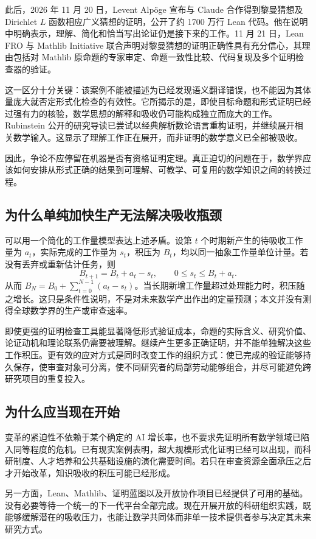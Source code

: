 \documentclass[UTF8,11pt,a4paper,fontset=fandol]{ctexart}
\theoremstyle{definition}\newtheorem{definition}{定义}
\begin{document}
此后，2026 年 11 月 20 日，Levent Alpöge 宣布与 Claude 合作得到黎曼猜想及 Dirichlet $L$ 函数相应广义猜想的证明，公开了约 1700 万行 Lean 代码。他在说明中明确表示，理解、简化和恰当写出论证仍是接下来的工作\cite{alpoge}。11 月 21 日，Lean FRO 与 Mathlib Initiative 联合声明对黎曼猜想的证明正确性具有充分信心，其理由包括对 Mathlib 原命题的专家审定、命题一致性比较、代码复现及多个证明检查器的验证\cite{rh}。

这一区分十分关键：该案例不能被描述为已经发现语义翻译错误，也不能因为其体量庞大就否定形式化检查的有效性。它所揭示的是，即使目标命题和形式证明已经过强有力的核验，数学思想的解释和吸收仍可能构成独立而庞大的工作。Rubinstein 公开的研究导读已尝试以经典解析数论语言重构证明，并继续展开相关数学输入\cite{rubinstein}。这显示了理解工作正在展开，而非证明的数学意义已全部被吸收。

因此，争论不应停留在机器是否有资格证明定理。真正迫切的问题在于，数学界应该如何安排从形式正确的结果到可理解、可教学、可复用的数学知识之间的转换过程。

\subsection{为什么单纯加快生产无法解决吸收瓶颈}
可以用一个简化的工作量模型表达上述矛盾。设第 $t$ 个时期新产生的待吸收工作量为 $a_t$，实际完成的工作量为 $s_t$，积压为 $B_t$，均以同一抽象工作量单位计量。若没有丢弃或重新估计任务，则
\[
 B_{t+1}=B_t+a_t-s_t,\qquad 0\le s_t\le B_t+a_t.
\]
从而 $B_N=B_0+\sum_{t=0}^{N-1}(a_t-s_t)$。当长期新增工作量超过处理能力时，积压随之增长。这只是条件性说明，不是对未来数学产出作出的定量预测；本文并没有测得全球数学界的生产或审查速率。

即使更强的证明检查工具能显著降低形式验证成本，命题的实际含义、研究价值、论证动机和理论联系仍需要被理解。继续产生更多正确证明，并不能单独解决这些工作积压。更有效的应对方式是同时改变工作的组织方式：使已完成的验证能够持久保存，使审查对象可分离，使不同研究者的局部劳动能够组合，并尽可能避免跨研究项目的重复投入。

\subsection{为什么应当现在开始}
变革的紧迫性不依赖于某个确定的 AI 增长率，也不要求先证明所有数学领域已陷入同等程度的危机。已有现实案例表明，超大规模形式化证明已经可以出现，而科研制度、人才培养和公共基础设施的演化需要时间。若只在审查资源全面承压之后才开始改革，知识吸收的积压可能已经形成。

另一方面，Lean、Mathlib、证明蓝图以及开放协作项目已经提供了可用的基础\cite{mathlib,kontorovich,architect,polymath}。没有必要等待一个统一的下一代平台全部完成。现在开展开放的科研组织实践，既能够缓解潜在的吸收压力，也能让数学共同体而非单一技术提供者参与决定其未来研究方式。
\end{document}
